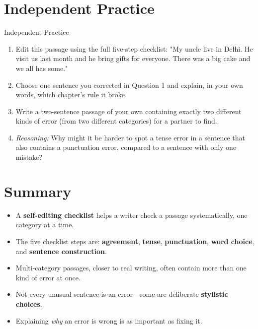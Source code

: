 \section{Independent Practice}
\begin{activitybox}{Independent Practice}
\begin{enumerate}
    \item Edit this passage using the full five-step checklist: "My uncle live in Delhi. He visit us last month and he bring gifts for everyone. There was a big cake and we all has some."
    \item Choose one sentence you corrected in Question 1 and explain, in your own words, which chapter's rule it broke.
    \item Write a two-sentence passage of your own containing exactly two different kinds of error (from two different categories) for a partner to find.
    \item \textit{Reasoning:} Why might it be harder to spot a tense error in a sentence that also contains a punctuation error, compared to a sentence with only one mistake?
\end{enumerate}
\end{activitybox}

\section{Summary}
\begin{summarybox}
\begin{itemize}
    \item A \textbf{self-editing checklist} helps a writer check a passage systematically, one category at a time.
    \item The five checklist steps are: \textbf{agreement}, \textbf{tense}, \textbf{punctuation}, \textbf{word choice}, and \textbf{sentence construction}.
    \item Multi-category passages, closer to real writing, often contain more than one kind of error at once.
    \item Not every unusual sentence is an error—some are deliberate \textbf{stylistic choices}.
    \item Explaining \textit{why} an error is wrong is as important as fixing it.
\end{itemize}
\end{summarybox}

